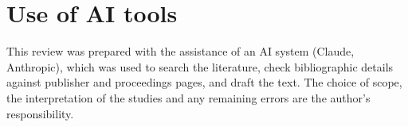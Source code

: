 \documentclass[11pt,a4paper]{article}
\begin{document}
\section*{Use of AI tools}
This review was prepared with the assistance of an AI system (Claude, Anthropic), which was used to search the
literature, check bibliographic details against publisher and proceedings pages, and draft the text. The choice of
scope, the interpretation of the studies and any remaining errors are the author's responsibility.



\end{document}
